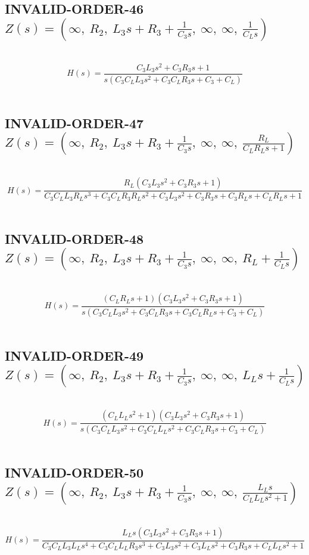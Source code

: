 \documentclass{article}
\begin{document}
\subsection{INVALID-ORDER-46 $Z(s) = \left( \infty, \  R_{2}, \  L_{3} s + R_{3} + \frac{1}{C_{3} s}, \  \infty, \  \infty, \  \frac{1}{C_{L} s}\right)$ } \ 
\textbf{\[H(s) = \frac{C_{3} L_{3} s^{2} + C_{3} R_{3} s + 1}{s \left(C_{3} C_{L} L_{3} s^{2} + C_{3} C_{L} R_{3} s + C_{3} + C_{L}\right)}\] } \ 
\subsection{INVALID-ORDER-47 $Z(s) = \left( \infty, \  R_{2}, \  L_{3} s + R_{3} + \frac{1}{C_{3} s}, \  \infty, \  \infty, \  \frac{R_{L}}{C_{L} R_{L} s + 1}\right)$ } \ 
\textbf{\[H(s) = \frac{R_{L} \left(C_{3} L_{3} s^{2} + C_{3} R_{3} s + 1\right)}{C_{3} C_{L} L_{3} R_{L} s^{3} + C_{3} C_{L} R_{3} R_{L} s^{2} + C_{3} L_{3} s^{2} + C_{3} R_{3} s + C_{3} R_{L} s + C_{L} R_{L} s + 1}\] } \ 
\subsection{INVALID-ORDER-48 $Z(s) = \left( \infty, \  R_{2}, \  L_{3} s + R_{3} + \frac{1}{C_{3} s}, \  \infty, \  \infty, \  R_{L} + \frac{1}{C_{L} s}\right)$ } \ 
\textbf{\[H(s) = \frac{\left(C_{L} R_{L} s + 1\right) \left(C_{3} L_{3} s^{2} + C_{3} R_{3} s + 1\right)}{s \left(C_{3} C_{L} L_{3} s^{2} + C_{3} C_{L} R_{3} s + C_{3} C_{L} R_{L} s + C_{3} + C_{L}\right)}\] } \ 
\subsection{INVALID-ORDER-49 $Z(s) = \left( \infty, \  R_{2}, \  L_{3} s + R_{3} + \frac{1}{C_{3} s}, \  \infty, \  \infty, \  L_{L} s + \frac{1}{C_{L} s}\right)$ } \ 
\textbf{\[H(s) = \frac{\left(C_{L} L_{L} s^{2} + 1\right) \left(C_{3} L_{3} s^{2} + C_{3} R_{3} s + 1\right)}{s \left(C_{3} C_{L} L_{3} s^{2} + C_{3} C_{L} L_{L} s^{2} + C_{3} C_{L} R_{3} s + C_{3} + C_{L}\right)}\] } \ 
\subsection{INVALID-ORDER-50 $Z(s) = \left( \infty, \  R_{2}, \  L_{3} s + R_{3} + \frac{1}{C_{3} s}, \  \infty, \  \infty, \  \frac{L_{L} s}{C_{L} L_{L} s^{2} + 1}\right)$ } \ 
\textbf{\[H(s) = \frac{L_{L} s \left(C_{3} L_{3} s^{2} + C_{3} R_{3} s + 1\right)}{C_{3} C_{L} L_{3} L_{L} s^{4} + C_{3} C_{L} L_{L} R_{3} s^{3} + C_{3} L_{3} s^{2} + C_{3} L_{L} s^{2} + C_{3} R_{3} s + C_{L} L_{L} s^{2} + 1}\] } \ 
\end{document}
